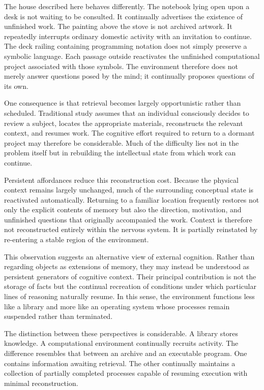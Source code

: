 \documentclass[12pt,oneside]{article}
\theoremstyle{remark}
\begin{document}
The house described here behaves differently. The notebook lying open upon a desk is not waiting to be consulted. It continually advertises the existence of unfinished work. The painting above the stove is not archived artwork. It repeatedly interrupts ordinary domestic activity with an invitation to continue. The deck railing containing programming notation does not simply preserve a symbolic language. Each passage outside reactivates the unfinished computational project associated with those symbols. The environment therefore does not merely answer questions posed by the mind; it continually proposes questions of its own.

One consequence is that retrieval becomes largely opportunistic rather than scheduled. Traditional study assumes that an individual consciously decides to review a subject, locates the appropriate materials, reconstructs the relevant context, and resumes work. The cognitive effort required to return to a dormant project may therefore be considerable. Much of the difficulty lies not in the problem itself but in rebuilding the intellectual state from which work can continue.

Persistent affordances reduce this reconstruction cost. Because the physical context remains largely unchanged, much of the surrounding conceptual state is reactivated automatically. Returning to a familiar location frequently restores not only the explicit contents of memory but also the direction, motivation, and unfinished questions that originally accompanied the work. Context is therefore not reconstructed entirely within the nervous system. It is partially reinstated by re-entering a stable region of the environment.

This observation suggests an alternative view of external cognition. Rather than regarding objects as extensions of memory, they may instead be understood as persistent generators of cognitive context. Their principal contribution is not the storage of facts but the continual recreation of conditions under which particular lines of reasoning naturally resume. In this sense, the environment functions less like a library and more like an operating system whose processes remain suspended rather than terminated.

The distinction between these perspectives is considerable. A library stores knowledge. A computational environment continually recruits activity. The difference resembles that between an archive and an executable program. One contains information awaiting retrieval. The other continually maintains a collection of partially completed processes capable of resuming execution with minimal reconstruction.
\end{document}

